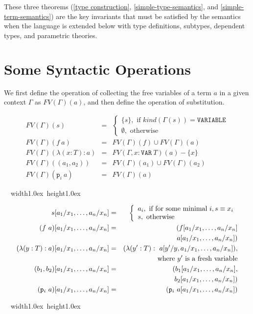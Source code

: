 \documentclass [12pt,twoside]{cslreport}
\newcommand{\thmbox}
   {{\ \hfill\hbox{%
      \vrule width1.0ex height1.0ex
   }\parfillskip 0pt }}
\newcommand{\union}{\cup}
\newcommand{\proj}[1]{\mathtt{p}_{#1}}
\newcommand{\listwo}[2]{#1_{1}, #1_{2}}
\newcommand{\ttvar}{\mathtt{VAR}}
\newcommand{\ttvariable}{\mathtt{VARIABLE}}
\newenvironment{Defn}[1]{\begin{definition}[#1]\label{defn:#1}}{
\thmbox\end{definition}}
\begin{document}
These three theorems (\ref{type construction},
\ref{simple-type-semantics}, and \ref{simple-term-semantics}) are the key
invariants that must be satisfied by the semantics when the language is
extended below with type definitions, subtypes, dependent types, and
parametric theories.

\section{Some Syntactic Operations}

We first define the operation of collecting the free variables of a
term $a$ in a given context $\Gamma$ as $FV(\Gamma)(a)$, and then
define the operation of substitution.
\begin{Defn}{free variables}
\begin{eqnarray*}
  FV(\Gamma)(s) & = & \left\{\begin{array}{l}
			      \{s \}, \mbox{ if } \textit{kind}(\Gamma(s))
= \ttvariable\\
                              \emptyset, \mbox{ otherwise}
			    \end{array}\right.\\
%
  FV(\Gamma)(f\ a) & = & FV(\Gamma)(f) \union FV(\Gamma)(a) \\
%
  FV(\Gamma)(\lambda (x : T) : a) & = &
     FV(\Gamma, x : \ttvar{}\ T)(a)
- \{x\} \\
%
 FV(\Gamma)((\listwo{a}{n})) & = & FV(\Gamma)(a_1)\union
FV(\Gamma)(a_2)\\
%
 FV(\Gamma)( \proj{i}\ a) & = & FV(\Gamma)(a)
\end{eqnarray*}
\end{Defn}
%
\begin{Defn}{substitution}
\begin{eqnarray*}
  s[a_1/x_1,\ldots, a_n/x_n] & = & \left\{\begin{array}{l}
					    a_i, \mbox{ if for some minimal } i,
s \equiv x_i\\
                                            s, \mbox{ otherwise}
					  \end{array}\right.\\
%
  (f\ a)[a_1/x_1,\ldots, a_n/x_n] & = &
     (f[a_1/x_1,\ldots, a_n/x_n]\\&&
       \hspace*{.5in} a[a_1/x_1,\ldots, a_n/x_n]) \\
%
  (\lambda (y : T): a)[a_1/x_1,\ldots, a_n/x_n] & = &
    (\lambda (y':T) :
     \ a[y'/y, a_1/x_1,\ldots, a_n/x_n]), \\ & & 
%
\mbox{where  } y' \mbox{ is a fresh variable}\\
%
 (\listwo{b}{m})[a_1/x_1,\ldots, a_n/x_n] & = &
     (b_1[a_1/x_1,\ldots, a_n/x_n],\\&&
       \hspace*{.5in}b_2[a_1/x_1,\ldots, a_n/x_n])\\
%
  ( \proj{i}\ a)[a_1/x_1,\ldots, a_n/x_n] & = &
   ( \proj{i}\ a[a_1/x_1,\ldots, a_n/x_n])
\end{eqnarray*}
\end{Defn}
\end{document}
